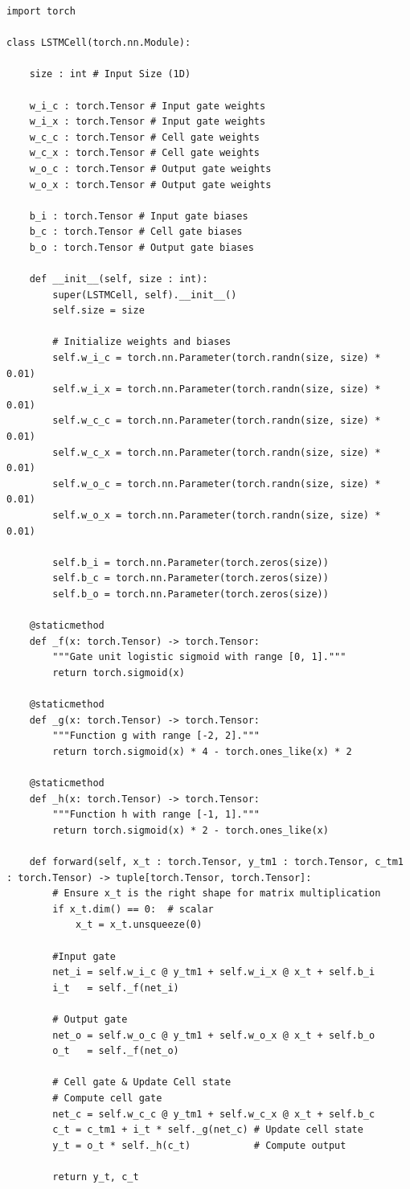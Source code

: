 \documentclass[twoside,a4paper,10pt,DIV=12,BCOR=12mm]{scrartcl}
\begin{document}
\begin{lstlisting}
import torch

class LSTMCell(torch.nn.Module):
    
    size : int # Input Size (1D)
    
    w_i_c : torch.Tensor # Input gate weights
    w_i_x : torch.Tensor # Input gate weights
    w_c_c : torch.Tensor # Cell gate weights
    w_c_x : torch.Tensor # Cell gate weights
    w_o_c : torch.Tensor # Output gate weights
    w_o_x : torch.Tensor # Output gate weights
    
    b_i : torch.Tensor # Input gate biases
    b_c : torch.Tensor # Cell gate biases
    b_o : torch.Tensor # Output gate biases
    
    def __init__(self, size : int):
        super(LSTMCell, self).__init__()
        self.size = size

        # Initialize weights and biases        
        self.w_i_c = torch.nn.Parameter(torch.randn(size, size) * 0.01)
        self.w_i_x = torch.nn.Parameter(torch.randn(size, size) * 0.01)
        self.w_c_c = torch.nn.Parameter(torch.randn(size, size) * 0.01)
        self.w_c_x = torch.nn.Parameter(torch.randn(size, size) * 0.01)
        self.w_o_c = torch.nn.Parameter(torch.randn(size, size) * 0.01)
        self.w_o_x = torch.nn.Parameter(torch.randn(size, size) * 0.01)
        
        self.b_i = torch.nn.Parameter(torch.zeros(size))
        self.b_c = torch.nn.Parameter(torch.zeros(size))
        self.b_o = torch.nn.Parameter(torch.zeros(size))    
        
    @staticmethod
    def _f(x: torch.Tensor) -> torch.Tensor:
        """Gate unit logistic sigmoid with range [0, 1]."""
        return torch.sigmoid(x)
    
    @staticmethod
    def _g(x: torch.Tensor) -> torch.Tensor:
        """Function g with range [-2, 2]."""
        return torch.sigmoid(x) * 4 - torch.ones_like(x) * 2
    
    @staticmethod
    def _h(x: torch.Tensor) -> torch.Tensor:
        """Function h with range [-1, 1]."""
        return torch.sigmoid(x) * 2 - torch.ones_like(x)
    
    def forward(self, x_t : torch.Tensor, y_tm1 : torch.Tensor, c_tm1 : torch.Tensor) -> tuple[torch.Tensor, torch.Tensor]:
        # Ensure x_t is the right shape for matrix multiplication
        if x_t.dim() == 0:  # scalar
            x_t = x_t.unsqueeze(0)
        
        #Input gate
        net_i = self.w_i_c @ y_tm1 + self.w_i_x @ x_t + self.b_i
        i_t   = self._f(net_i)
        
        # Output gate
        net_o = self.w_o_c @ y_tm1 + self.w_o_x @ x_t + self.b_o
        o_t   = self._f(net_o)
        
        # Cell gate & Update Cell state
        # Compute cell gate
        net_c = self.w_c_c @ y_tm1 + self.w_c_x @ x_t + self.b_c
        c_t = c_tm1 + i_t * self._g(net_c) # Update cell state
        y_t = o_t * self._h(c_t)           # Compute output
        
        return y_t, c_t
\end{lstlisting}



\end{document}
